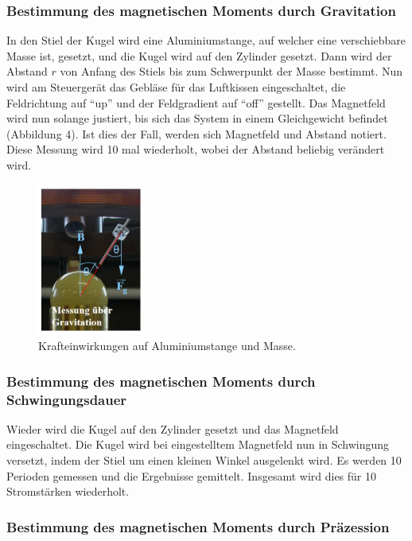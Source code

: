 \subsubsection{Bestimmung des magnetischen Moments durch Gravitation}
In den Stiel der Kugel wird eine Aluminiumstange, auf welcher eine verschiebbare Masse ist, gesetzt, und die Kugel wird auf den Zylinder gesetzt.
Dann wird der Abstand $r$ von Anfang des Stiels bis zum Schwerpunkt der Masse bestimmt. 
Nun wird am Steuergerät das Gebläse für das Luftkissen eingeschaltet, die Feldrichtung auf ``up'' und der Feldgradient auf ``off'' gestellt.
Das Magnetfeld wird nun solange justiert, bis sich das System in einem Gleichgewicht befindet (Abbildung 4). 
Ist dies der Fall, werden sich Magnetfeld und Abstand notiert.
Diese Messung wird 10 mal wiederholt, wobei der Abstand beliebig verändert wird.

\begin{figure}[H]
  \centering
  \includegraphics[height=5cm]{Screenshot (4)}
  \caption{Krafteinwirkungen auf Aluminiumstange und Masse. \cite[S. 3]{kent}}
  \label{fig:drill}
\end{figure}


\subsubsection{Bestimmung des magnetischen Moments durch Schwingungsdauer}

Wieder wird die Kugel auf den Zylinder gesetzt und das Magnetfeld eingeschaltet.
Die Kugel wird bei eingestelltem Magnetfeld nun in Schwingung versetzt, indem der Stiel um einen kleinen Winkel ausgelenkt wird.
Es werden 10 Perioden gemessen und die Ergebnisse gemittelt. Insgesamt wird dies für 10 Stromstärken wiederholt.


\subsubsection{Bestimmung des magnetischen Moments durch Präzession}

